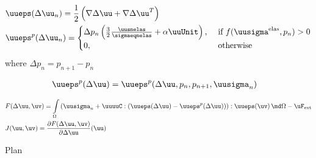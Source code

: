 \documentclass[12pt]{article}
\begin{document}
\begin{align}
    & \uueps(\Delta\uu_n) = \frac{1}{2} \left( \nabla\Delta\uu + \nabla\Delta\uu^T \right) \\
    & \uueps^p(\Delta\uu_n) = 
        \begin{cases}
            \Delta p_n \left( \frac{3}{2}\frac{\uusnelas}{\sigmaeqnelas} + \alpha \uuUnit \right), & \text{ if } f(\uusigma^\text{elas}, p_n) > 0  \\
            0, & \text{ otherwise}
        \end{cases}
\end{align}
where $\Delta p_n = p_{n+1} - p_n$ 

\begin{align}
    & \uueps^p(\Delta\uu) = \uueps^p(\Delta\uu, p_n, p_{n+1}, \uusigma_n)
\end{align}

\begin{align}
    & F(\Delta\uu, \uv) = \int\limits_\Omega \left( \uusigma_n + \uuuuC : (\uueps(\Delta\uu) - \uueps^p(\Delta\uu)) \right) : \uueps(\uv) \, \md\Omega - \uF_\text{ext} \\
    & J(\uu, \uv) = \frac{\partial F(\Delta\uu, \uv)}{\partial\Delta\uu}(\uu)
\end{align}

Plan
\end{document}
